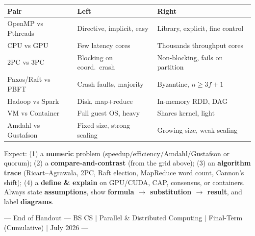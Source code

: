 \documentclass[11pt,a4paper]{article}
\begin{document}
\vspace{6pt}
\begin{center}
\begin{tcolorbox}[
  enhanced, colback=orange!5, colframe=orange!70!black,
  boxrule=1pt, arc=4pt, width=\textwidth,
  title={\faIcon{tasks}~High-Yield Comparison Grid}, fonttitle=\bfseries,
  colbacktitle=orange!70!black, coltitle=white
]
\begin{tabular}{@{}p{3.4cm}p{5.2cm}p{5.2cm}@{}}
\toprule
\rowcolor{orange!20}
\textbf{Pair} & \textbf{Left} & \textbf{Right} \\
\midrule
OpenMP vs Pthreads & Directive, implicit, easy & Library, explicit, fine control \\
CPU vs GPU & Few latency cores & Thousands throughput cores \\
2PC vs 3PC & Blocking on coord.\ crash & Non-blocking, fails on partition \\
Paxos/Raft vs PBFT & Crash faults, majority & Byzantine, $n\ge 3f{+}1$ \\
Hadoop vs Spark & Disk, map+reduce & In-memory RDD, DAG \\
VM vs Container & Full guest OS, heavy & Shares kernel, light \\
Amdahl vs Gustafson & Fixed size, strong scaling & Growing size, weak scaling \\
\bottomrule
\end{tabular}
\end{tcolorbox}
\end{center}

\vspace{6pt}
\begin{conceptbox}
Expect: (1) a \textbf{numeric} problem (speedup/efficiency/Amdahl/Gustafson or quorum); (2) a \textbf{compare-and-contrast} (from the grid above); (3) an \textbf{algorithm trace} (Ricart--Agrawala, 2PC, Raft election, MapReduce word count, Cannon's shift); (4) a \textbf{define \& explain} on GPU/CUDA, CAP, consensus, or containers. Always state \textbf{assumptions}, show \textbf{formula $\to$ substitution $\to$ result}, and label \textbf{diagrams}.
\end{conceptbox}

\vspace{6pt}
\begin{center}
\textcolor{gray!60}{\small --- End of Handout --- BS CS $|$ Parallel \& Distributed Computing $|$ Final-Term (Cumulative) $|$ July 2026 ---}
\end{center}
\end{document}
